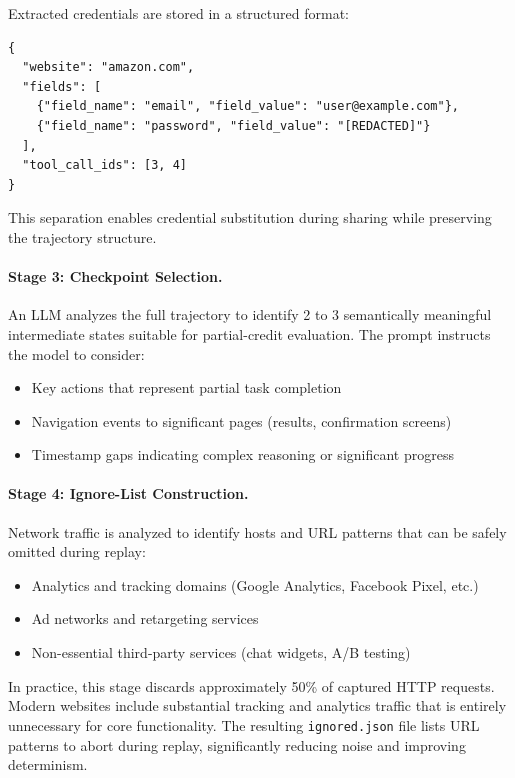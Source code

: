 \documentclass[letterpaper]{article}
\begin{document}
Extracted credentials are stored in a structured format:

\begin{lstlisting}
{
  "website": "amazon.com",
  "fields": [
    {"field_name": "email", "field_value": "user@example.com"},
    {"field_name": "password", "field_value": "[REDACTED]"}
  ],
  "tool_call_ids": [3, 4]
}
\end{lstlisting}

This separation enables credential substitution during sharing while preserving the trajectory structure.

\paragraph{Stage 3: Checkpoint Selection.} An LLM analyzes the full trajectory to identify 2 to 3 semantically meaningful intermediate states suitable for partial-credit evaluation. The prompt instructs the model to consider:

\begin{itemize}
    \item Key actions that represent partial task completion
    \item Navigation events to significant pages (results, confirmation screens)
    \item Timestamp gaps indicating complex reasoning or significant progress
\end{itemize}

\paragraph{Stage 4: Ignore-List Construction.} Network traffic is analyzed to identify hosts and URL patterns that can be safely omitted during replay:

\begin{itemize}
    \item Analytics and tracking domains (Google Analytics, Facebook Pixel, etc.)
    \item Ad networks and retargeting services
    \item Non-essential third-party services (chat widgets, A/B testing)
\end{itemize}

In practice, this stage discards approximately 50\% of captured HTTP requests. Modern websites include substantial tracking and analytics traffic that is entirely unnecessary for core functionality. The resulting \texttt{ignored.json} file lists URL patterns to abort during replay, significantly reducing noise and improving determinism.
\end{document}
